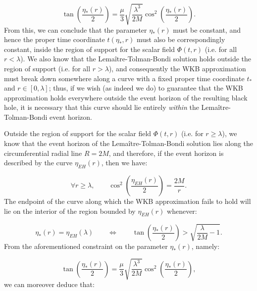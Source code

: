 \documentclass{article}
\begin{document}
\begin{equation}
\tan \left( \frac{\eta_{*} \left( r \right)}{2} \right) = \frac{\mu}{3} \sqrt{\frac{\lambda^3}{2 M}} \cos^2 \left( \frac{\eta_{*} \left( r \right)}{2} \right).
\end{equation}
From this, we can conclude that the parameter ${\eta_{*} \left( r \right)}$ must be constant, and hence the proper time coordinate ${t \left( \eta_{*}, r \right)}$ must also be correspondingly constant, inside the region of support for the scalar field ${\Phi \left( t, r \right)}$ (i.e. for all ${r < \lambda}$). We also know that the Lema\^itre-Tolman-Bondi solution holds outside the region of support (i.e. for all ${r > \lambda}$), and consequently the WKB approximation must break down somewhere along a curve with a fixed proper time coordinate ${t_{*}}$ and ${r \in \left[ 0, \lambda \right]}$; thus, if we wish (as indeed we do) to guarantee that the WKB approximation holds everywhere outside the event horizon of the resulting black hole, it is necessary that this curve should lie entirely \textit{within} the Lema\^itre-Tolman-Bondi event horizon.

Outside the region of support for the scalar field ${\Phi \left( t, r \right)}$ (i.e. for ${r \geq \lambda}$), we know that the event horizon of the Lema\^itre-Tolman-Bondi solution lies along the circumferential radial line ${R = 2 M}$, and therefore, if the event horizon is described by the curve ${\eta_{EH} \left( r \right)}$, then we have:

\begin{equation}
\forall r \geq \lambda, \qquad \cos^2 \left( \frac{\eta_{EH} \left( r \right)}{2} \right) = \frac{2M}{r}.
\end{equation}
The endpoint of the curve along which the WKB approximation fails to hold will lie on the interior of the region bounded by ${\eta_{EH} \left( r \right)}$ whenever:

\begin{equation}
\eta_{*} \left( r \right) = \eta_{EH} \left( \lambda \right) \qquad \iff \qquad \tan \left( \frac{\eta_{*} \left( r \right)}{2} \right) > \sqrt{\frac{\lambda}{2M}  -1}.
\end{equation}
From the aforementioned constraint on the parameter ${\eta_{*} \left( r \right)}$, namely:

\begin{equation}
\tan \left( \frac{\eta_{*} \left( r \right)}{2} \right) = \frac{\mu}{3} \sqrt{\frac{\lambda^3}{2M}} \cos^2 \left( \frac{\eta_{*} \left( r \right)}{2} \right),
\end{equation}
we can moreover deduce that:
\end{document}

